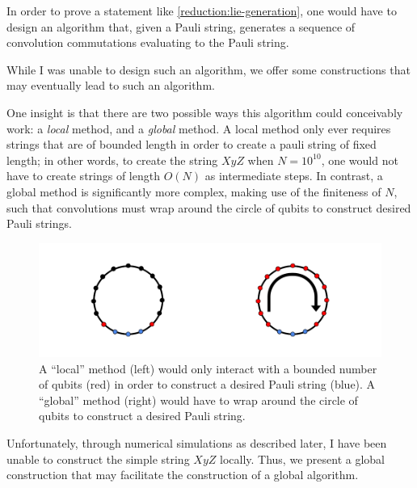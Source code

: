 \documentclass[fleqn,12pt]{article}
\begin{document}
In order to prove a statement like \ref{reduction:lie-generation},
one would have to design an algorithm that, given a Pauli string, generates a sequence of convolution
commutations evaluating to the Pauli string.

While I was unable to design such an algorithm, we offer
some constructions that may eventually
lead to such an algorithm.

One insight is that there are two possible ways this algorithm could conceivably
work: a \emph{local} method, and a \emph{global} method. A local method only
ever requires strings that are of bounded length in order to create a pauli string of fixed length;
in other words, to create the string $XyZ$ when $N = 10^{10}$, one would not
have to create strings of length $O(N)$
as intermediate steps. In contrast, a global method is significantly more complex,
making use of the finiteness of $N$, such that convolutions must wrap around the
circle of qubits to construct desired Pauli strings.

\begin{figure}[h]
    \includegraphics[width = \textwidth]{Untitled drawing.png}
    \caption{A ``local'' method (left) would only interact with a bounded number of qubits
        (red) in order to construct a desired Pauli string (blue). A ``global'' method (right)
        would have to wrap around the circle of qubits to construct a desired Pauli string.}
\end{figure}


Unfortunately, through numerical simulations as described later, I have been unable
to construct the simple string $XyZ$ locally. Thus, we present a global construction
that may facilitate the construction of a global algorithm.
\end{document}
